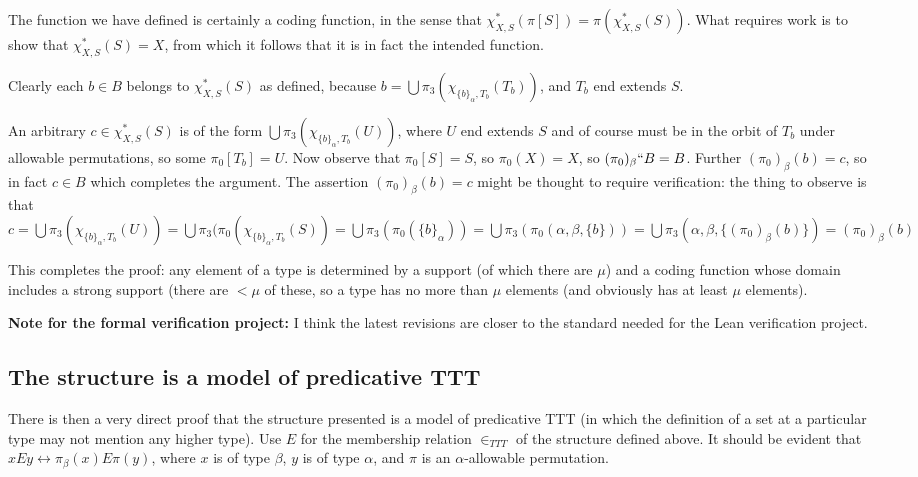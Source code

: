 \documentclass[112pt]{article}
\begin{document}
\begin{description}
The function we have defined is certainly a coding function, in the sense that $\chi_{X,S}^*(\pi[S]) = \pi(\chi_{X,S}^*(S))$.  What requires work is to show that
$\chi_{X,S}^*(S)=X$, from which it follows that it is in fact the intended function.

Clearly each $b \in B$ belongs to $\chi^*_{X,S}(S)$ as defined, because $b = \bigcup \pi_3(\chi_{\{b\}_\alpha,T_b}(T_b))$, and $T_b$ end extends $S$.

An arbitrary $c \in \chi_{X,S}^*(S)$ is of the form $\bigcup \pi_3(\chi_{\{b\}_\alpha,T_b}(U))$, where $U$ end extends $S$ and of course must be in the orbit of $T_b$ under allowable permutations, so some $\pi_0[T_b] = U$. Now observe that $\pi_0[S]=S$, so $\pi_0(X)=X$, so
$(\pi_0)_\beta``B=B$.  Further $(\pi_0)_\beta(b) = c$, so in fact $c \in B$ which completes the argument.  The assertion $(\pi_0)_\beta(b) = c$ might be thought to require verification:   the thing to observe is that $c=\bigcup \pi_3(\chi_{\{b\}_\alpha,T_b}(U))=\bigcup\pi_3(\pi_0(\chi_{\{b\}_\alpha,T_b}(S))=
\bigcup\pi_3(\pi_0(\{b\}_\alpha)) = \bigcup\pi_3(\pi_0(\alpha,\beta,\{b\})) =\bigcup\pi_3(\alpha,\beta,\{(\pi_0)_\beta(b)\}) = (\pi_0)_\beta(b)$


\end{description}

This completes the proof:  any element of a type is determined by a support (of which there are $\mu$) and a coding function whose domain includes a strong support (there are $<\mu$ of these, so a type has no more than $\mu$ elements (and obviously has at least $\mu$ elements).


{\bf Note for the formal verification project:}  I think the latest revisions are closer to the standard needed for the Lean verification project.
\newpage
\subsection{The structure is a model of predicative TTT}

There is then a very direct proof that the structure presented is a model of predicative TTT (in which the definition of a set at a particular type may not mention any higher type).  Use $E$ for the membership relation $\in_{TTT}$ of the structure defined above.  It should be evident that $x E y \leftrightarrow \pi_\beta(x) E \pi(y)$,
where $x$ is of type $\beta$, $y$ is of type $\alpha$, and $\pi$ is an $\alpha$-allowable permutation.
\end{document}
